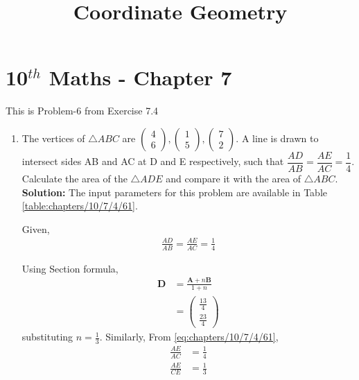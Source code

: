 \documentclass[12pt]{article}
\newcommand{\solution}{\noindent \textbf{Solution: }}
\newcommand{\myvec}[1]{\ensuremath{\begin{pmatrix}#1\end{pmatrix}}}
\let\vec\mathbf
\begin{document}
\begin{center}
\title{\textbf{Coordinate Geometry}}
\date{\vspace{-5ex}} %
\maketitle
\end{center}
\setcounter{page}{1}
\section*{10$^{th}$ Maths - Chapter 7}
This is Problem-6 from Exercise 7.4
\begin{enumerate}
\item The vertices of $\triangle ABC$ are $\myvec{4 \\ 6}, \myvec{1\\5}, \myvec{7\\2}$. A line is drawn to intersect sides AB and AC at D and E respectively, such that $\dfrac{AD}{AB}=\dfrac{AE}{AC}=\dfrac{1}{4}$. Calculate the area of the $\triangle ADE$ and compare it with the area of $\triangle ABC$.\\
\solution 
\fi
		The input parameters for this problem are available in Table \eqref{table:chapters/10/7/4/61}.
\begin{table}[ht!]\centering

\caption{}
\label{table:chapters/10/7/4/61}	
\end{table}
%
Given,
\begin{align}
\frac{AD}{AB}=\frac{AE}{AC}=\frac{1}{4}\label{eq:chapters/10/7/4/61}
\end{align}

	Using Section formula,
\begin{align}
\vec{D} &=\frac{\vec{A}+n\vec{B}}{1+n}\label{eq:chapters/10/7/4/64}
\\
	&=\myvec{\frac{13}{4}\\[2pt] \frac{23}{4}}
\end{align}
substituting
		$n = \frac{1}{3}$.
Similarly,
\iffalse
From \eqref{eq:chapters/10/7/4/61},
\begin{align}
\frac{AE}{AC} &=\frac{1}{4}\\
\frac{AE}{CE} &=\frac{1}{3}

\end{align}
\end{enumerate}
\end{document}
